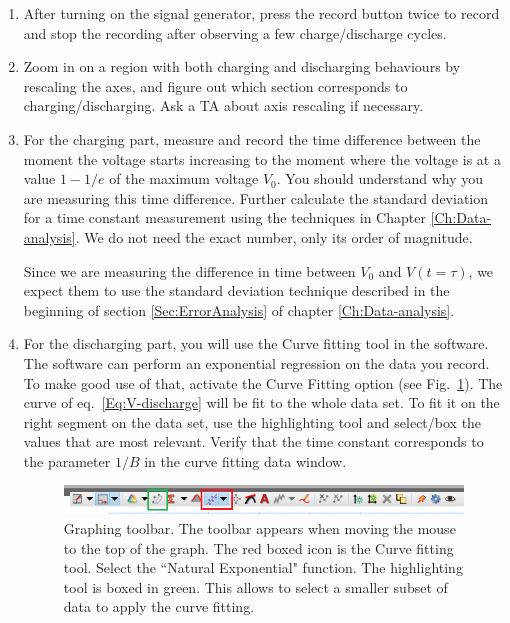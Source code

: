 \documentclass[12pt]{report}
\begin{document}
\begin{enumerate}
\item After turning on the signal generator, press the record button twice to record and stop the recording after observing a few charge/discharge cycles.

\item Zoom in on a region with both charging and discharging behaviours by rescaling the axes, and figure out which section corresponds to charging/discharging. Ask a TA about axis rescaling if necessary.

\item For the charging part, {\color{blue} measure and record the time difference between the moment the voltage starts increasing to the moment where the voltage is at a value $1-1/e$ of the maximum voltage $V_0$. 
You should understand why you are measuring this time difference.
Further calculate the standard deviation for a time constant measurement using the techniques in Chapter \ref{Ch:Data-analysis}. We do not need the exact number, only its order of magnitude.}
\begin{tcolorbox}
Since we are measuring the difference in time between $V_0$ and $V(t=\tau)$, we expect them to use the standard deviation technique described in the beginning of section \ref{Sec:ErrorAnalysis} of chapter \ref{Ch:Data-analysis}.
\end{tcolorbox}

\item For the discharging part, you will use the Curve fitting tool in the software. The software can perform an exponential regression on the data you record. To make good use of that, activate the Curve Fitting option (see Fig.~\ref{Fig:lab2-interface-graph}). The curve of eq.~\eqref{Eq:V-discharge} will be fit to the whole data set. To fit it on the right segment on the data set, use the highlighting tool and select/box the values that are most relevant.  Verify that the time constant corresponds to the parameter $1/B$ in the curve fitting data window.
\begin{figure}[h]
\centering
\includegraphics[width=0.9 \linewidth]{lab2-interface-graph-tools}
\caption{Graphing toolbar. The toolbar appears when moving the mouse to the top of the graph. The red boxed icon is the Curve fitting tool. Select the ``Natural Exponential" function. 
The highlighting tool is boxed in green. This allows to select a smaller subset of data to apply the curve fitting.}
\label{Fig:lab2-interface-graph}
\end{figure}


\end{enumerate}
\end{document}
